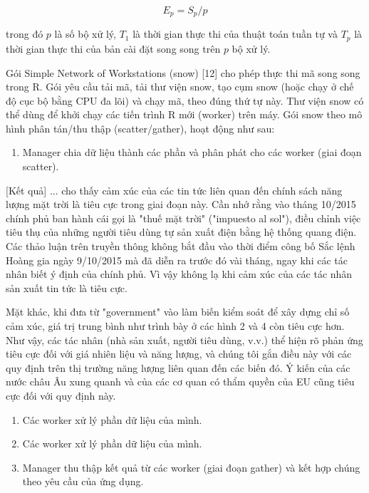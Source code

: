 \begin{equation*}E_p = S_p / p \tag{2}\end{equation*}

trong đó \(p\) là số bộ xử lý, \(T_1\) là thời gian thực thi của thuật toán tuần tự và \(T_p\) là thời gian thực thi của bản cài đặt song song trên \(p\) bộ xử lý.

Gói Simple Network of Workstations (snow) {[}12{]} cho phép thực thi mã song song trong R. Gói yêu cầu tải mã, tải thư viện snow, tạo cụm snow (hoặc chạy ở chế độ cục bộ bằng CPU đa lõi) và chạy mã, theo đúng thứ tự này. Thư viện snow có thể dùng để khởi chạy các tiến trình R mới (worker) trên máy. Gói snow theo mô hình phân tán/thu thập (scatter/gather), hoạt động như sau:

\begin{enumerate}
\def\labelenumi{\arabic{enumi}.}
\item
  Manager chia dữ liệu thành các phần và phân phát cho các worker (giai đoạn scatter).
\end{enumerate}

{[}Kết quả{]} ... cho thấy cảm xúc của các tin tức liên quan đến chính sách năng lượng mặt trời là tiêu cực trong giai đoạn này. Cần nhớ rằng vào tháng 10/2015 chính phủ ban hành cái gọi là "thuế mặt trời" ("impuesto al sol"), điều chỉnh việc tiêu thụ của những người tiêu dùng tự sản xuất điện bằng hệ thống quang điện. Các thảo luận trên truyền thông không bắt đầu vào thời điểm công bố Sắc lệnh Hoàng gia ngày 9/10/2015 mà đã diễn ra trước đó vài tháng, ngay khi các tác nhân biết ý định của chính phủ. Vì vậy không lạ khi cảm xúc của các tác nhân sản xuất tin tức là tiêu cực.

Mặt khác, khi đưa từ "government" vào làm biến kiểm soát để xây dựng chỉ số cảm xúc, giá trị trung bình như trình bày ở các hình 2 và 4 còn tiêu cực hơn. Như vậy, các tác nhân (nhà sản xuất, người tiêu dùng, v.v.) thể hiện rõ phản ứng tiêu cực đối với giá nhiên liệu và năng lượng, và chúng tôi gắn điều này với các quy định trên thị trường năng lượng liên quan đến các biến đó. Ý kiến của các nước châu Âu xung quanh và của các cơ quan có thẩm quyền của EU cũng tiêu cực đối với quy định này.

\begin{enumerate}
\def\labelenumi{\arabic{enumi}.}
\setcounter{enumi}{1}
\item
  Các worker xử lý phần dữ liệu của mình.
\item
  Các worker xử lý phần dữ liệu của mình.
\item
  Manager thu thập kết quả từ các worker (giai đoạn gather) và kết hợp chúng theo yêu cầu của ứng dụng.
\end{enumerate}

